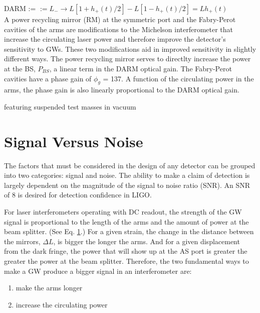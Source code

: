 DARM := $:= L_- \longrightarrow L [1 + h_+(t)/2] - L[1 - h_+(t)/2] = Lh_+(t)$ \\





A power recycling mirror (RM) at the symmetric port and the
Fabry-Perot cavities of the arms are modifications to the Michelson
interferometer that increase the circulating laser power and therefore
improve the detector's sensitivity to GWs. These two modifications
aid in improved sensitivity in slightly different ways. The power
recycling mirror serves to directlty increase the power at the BS,
$P_{BS}$, a linear term in the DARM optical gain. The Fabry-Perot
cavities have a phase gain of $\phi_g$ = 137. A function of the
circulating power in the arms, the phase gain is also linearly
proportional to the DARM optical gain.


featuring suspended test masses in vacuum 










\section{Signal Versus Noise}
The factors that must be considered in the design of any detector can
be grouped into two categories: signal and noise. The ability to make
a claim of detection is largely dependent on the magnitude of the
signal to noise ratio (SNR). An SNR of 8 is desired for detection
confidence in LIGO. 

For laser interferometers operating with DC readout, the strength of
the GW signal is proportional to the length of the arms and the amount
of power at the beam splitter. (See Eq. \ref{}.) For a given strain,
the change in the distance between the mirrors, $\Delta L$, is bigger
the longer the arms. And for a given displacement from the dark
fringe, the power that will show up at the AS port is greater the
greater the power at the beam splitter. Therefore, the two fundamental
ways to make a GW produce a bigger signal in an interferometer are:
\begin{enumerate}
\item make the arms longer \vspace{-10 pt}
\item increase the circulating power
\end{enumerate}

